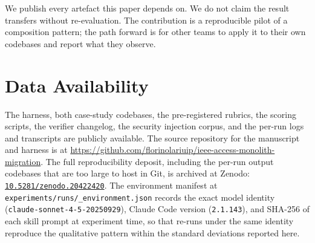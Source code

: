 \documentclass[journal]{IEEEtran}
\begin{document}
We publish every artefact this paper depends on. We do not claim
the result transfers without re-evaluation. The contribution is
a reproducible pilot of a composition pattern; the path forward
is for other teams to apply it to their own codebases and
report what they observe.

\section*{Data Availability}
The harness, both case-study codebases, the pre-registered rubrics,
the scoring scripts, the verifier changelog, the security injection
corpus, and the per-run logs and transcripts are publicly available.
The source repository for the manuscript and harness is at
\url{https://github.com/florinolariuip/ieee-access-monolith-migration}.
The full reproducibility deposit, including the per-run output
codebases that are too large to host in Git, is archived at Zenodo:
\href{https://doi.org/10.5281/zenodo.20422420}{\texttt{10.5281/zenodo.20422420}}. The environment manifest at
\texttt{experiments/runs/\_environment.json} records the exact model
identity (\texttt{claude-sonnet-4-5-20250929}), Claude Code version
(\texttt{2.1.143}), and SHA-256 of each skill prompt at experiment
time, so that re-runs under the same identity reproduce the
qualitative pattern within the standard deviations reported here.



\end{document}
